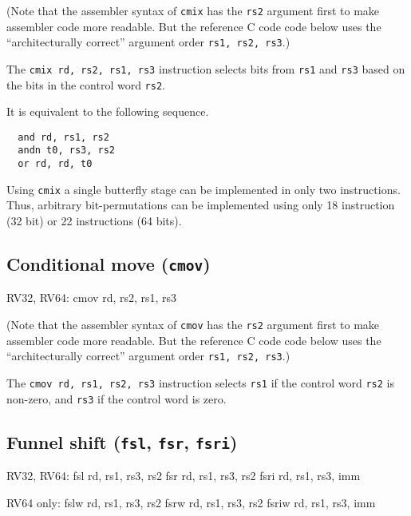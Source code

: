 (Note that the assembler syntax of {\tt cmix} has the {\tt rs2} argument first
to make assembler code more readable. But the reference C code code below uses
the ``architecturally correct'' argument order {\tt rs1, rs2, rs3}.)

The {\tt cmix rd, rs2, rs1, rs3} instruction selects bits from {\tt rs1} and {\tt rs3} based
on the bits in the control word {\tt rs2}.



It is equivalent to the following sequence.

\begin{minipage}{\linewidth}
\begin{verbatim}
  and rd, rs1, rs2
  andn t0, rs3, rs2
  or rd, rd, t0
\end{verbatim}
\end{minipage}

Using {\tt cmix} a single butterfly stage can be implemented in only two
instructions. Thus, arbitrary bit-permutations can be implemented using only
18 instruction (32 bit) or 22 instructions (64 bits).

\subsection{Conditional move ({\tt cmov})}

\begin{rvb}
  RV32, RV64:
    cmov rd, rs2, rs1, rs3
\end{rvb}

(Note that the assembler syntax of {\tt cmov} has the {\tt rs2} argument first
to make assembler code more readable. But the reference C code code below uses
the ``architecturally correct'' argument order {\tt rs1, rs2, rs3}.)

The {\tt cmov rd, rs1, rs2, rs3} instruction selects {\tt rs1} if the control
word {\tt rs2} is non-zero, and {\tt rs3} if the control word is zero.



\subsection{Funnel shift ({\tt fsl}, {\tt fsr}, {\tt fsri})}

\begin{rvb}
  RV32, RV64:
    fsl  rd, rs1, rs3, rs2
    fsr  rd, rs1, rs3, rs2
    fsri rd, rs1, rs3, imm

  RV64 only:
    fslw  rd, rs1, rs3, rs2
    fsrw  rd, rs1, rs3, rs2
    fsriw rd, rs1, rs3, imm
\end{rvb}

